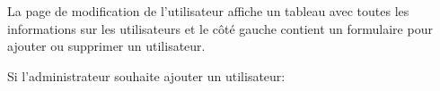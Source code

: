 \documentclass{article}
\begin{document}
\begin{enumerate}
  
  
  \vspace{0.7cm}
               \hspace*{-0.7in}
               \noindent{}
  
  
  La page de modification de l'utilisateur affiche un tableau avec toutes les informations sur les utilisateurs et le côté gauche contient un formulaire pour ajouter ou supprimer un utilisateur.
  
  
  
  \vspace{0.7cm}
               \hspace*{-0.7in}
               \noindent{}
  
  
  Si l'administrateur souhaite ajouter un utilisateur:
  

\end{enumerate}
\end{document}
